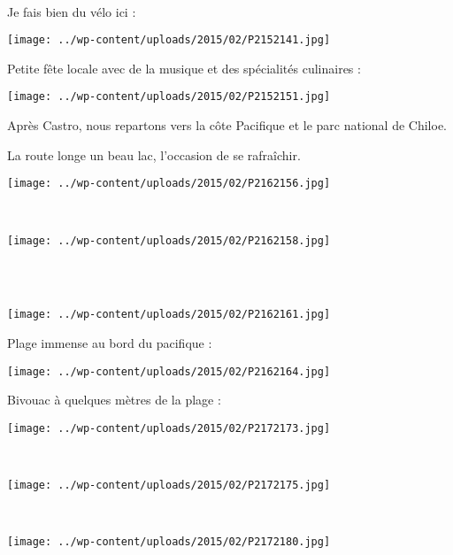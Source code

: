 ~

 Je fais bien du vélo ici :\\
\begin{center} \texttt{[image: ../wp-content/uploads/2015/02/P2152141.jpg]} \end{center}
\vspace{-\topsep}

\pagebreak
 Petite fête locale avec de la musique et des spécialités culinaires :
\begin{center} \texttt{[image: ../wp-content/uploads/2015/02/P2152151.jpg]} \end{center}

 Après Castro, nous repartons vers la côte Pacifique et le parc national de Chiloe.

 La route longe un beau lac, l'occasion de se rafraîchir.
\begin{center} \texttt{[image: ../wp-content/uploads/2015/02/P2162156.jpg]} \end{center}
\vspace{-\topsep}

\pagebreak
~
\begin{center} \texttt{[image: ../wp-content/uploads/2015/02/P2162158.jpg]} \end{center}
~\\

~
\begin{center} \texttt{[image: ../wp-content/uploads/2015/02/P2162161.jpg]} \end{center}
\vspace{-\topsep}

\pagebreak
 Plage immense au bord du pacifique :
\begin{center} \texttt{[image: ../wp-content/uploads/2015/02/P2162164.jpg]} \end{center}

 Bivouac à quelques mètres de la plage :
\begin{center} \texttt{[image: ../wp-content/uploads/2015/02/P2172173.jpg]} \end{center}
\vspace{-\topsep}

\pagebreak
~
\begin{center} \texttt{[image: ../wp-content/uploads/2015/02/P2172175.jpg]} \end{center}
~
\begin{center} \texttt{[image: ../wp-content/uploads/2015/02/P2172180.jpg]} \end{center}
\vspace{-\topsep}


